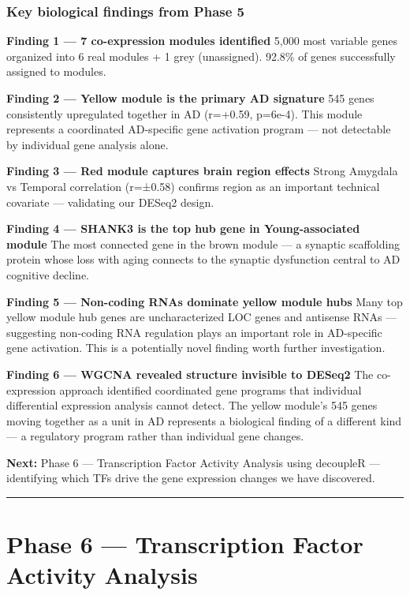 \documentclass[
]{article}
\begin{document}
\subsubsection{Key biological findings from Phase
5}\label{key-biological-findings-from-phase-5}

\textbf{Finding 1 --- 7 co-expression modules identified} 5,000 most
variable genes organized into 6 real modules + 1 grey (unassigned).
92.8\% of genes successfully assigned to modules.

\textbf{Finding 2 --- Yellow module is the primary AD signature} 545
genes consistently upregulated together in AD (r=+0.59, p=6e-4). This
module represents a coordinated AD-specific gene activation program ---
not detectable by individual gene analysis alone.

\textbf{Finding 3 --- Red module captures brain region effects} Strong
Amygdala vs Temporal correlation (r=±0.58) confirms region as an
important technical covariate --- validating our DESeq2 design.

\textbf{Finding 4 --- SHANK3 is the top hub gene in Young-associated
module} The most connected gene in the brown module --- a synaptic
scaffolding protein whose loss with aging connects to the synaptic
dysfunction central to AD cognitive decline.

\textbf{Finding 5 --- Non-coding RNAs dominate yellow module hubs} Many
top yellow module hub genes are uncharacterized LOC genes and antisense
RNAs --- suggesting non-coding RNA regulation plays an important role in
AD-specific gene activation. This is a potentially novel finding worth
further investigation.

\textbf{Finding 6 --- WGCNA revealed structure invisible to DESeq2} The
co-expression approach identified coordinated gene programs that
individual differential expression analysis cannot detect. The yellow
module's 545 genes moving together as a unit in AD represents a
biological finding of a different kind --- a regulatory program rather
than individual gene changes.

\textbf{Next:} Phase 6 --- Transcription Factor Activity Analysis using
decoupleR --- identifying which TFs drive the gene expression changes we
have discovered.

\begin{center}\rule{0.5\linewidth}{0.5pt}\end{center}

\section{Phase 6 --- Transcription Factor Activity
Analysis}\label{phase-6-transcription-factor-activity-analysis}
\end{document}
